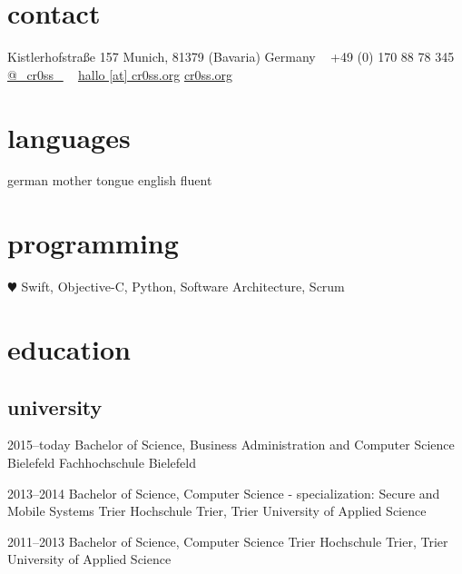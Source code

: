 \documentclass[]{friggeri-cv} %
\begin{document}


\begin{aside} %
	\section{contact}
	Kistlerhofstraße 157
	Munich, 81379 (Bavaria)
	Germany
	~
	+49 (0) 170 88 78 345
	\href{https://twitter.com/_cr0ss_}{@\_cr0ss\_}
	~
	\href{mailto:hallo@cr0ss.org}{hallo [at] cr0ss.org}
	\href{https://cr0ss.org}{cr0ss.org}
	\section{languages}
	german mother tongue
	english fluent
	\section{programming}
	{\color{red} $\varheartsuit$} Swift,
	Objective-C, Python,
	Software Architecture,
	Scrum
\end{aside}


\section{education}

\subsection{university}

\begin{entrylist}
	
	\entry
	{2015--today}
	{Bachelor of Science, Business Administration and Computer Science}
	{Bielefeld}
	{Fachhochschule Bielefeld}
	
	
	\entry
	{2013--2014}
	{Bachelor of Science, Computer Science - specialization: Secure and Mobile Systems}
	{Trier}
	{Hochschule Trier, Trier University of Applied Science}
	
	
	\entry
	{2011--2013}
	{Bachelor of Science, Computer Science}
	{Trier}
	{Hochschule Trier, Trier University of Applied Science}
	
	
\end{entrylist}
\end{document}
